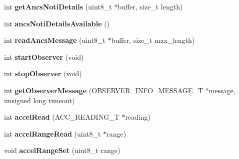 \begin{DoxyCompactItemize}
\item 
\hypertarget{class_bean_serial_transport_a88dd8beb51456e649b0bd3e0e98619ed}{}int {\bfseries get\+Ancs\+Noti\+Details} (uint8\+\_\+t $\ast$buffer, size\+\_\+t length)\label{class_bean_serial_transport_a88dd8beb51456e649b0bd3e0e98619ed}

\item 
\hypertarget{class_bean_serial_transport_a48970dd3b7bfd73d3ced63fbcc0477f9}{}int {\bfseries ancs\+Noti\+Details\+Available} ()\label{class_bean_serial_transport_a48970dd3b7bfd73d3ced63fbcc0477f9}

\item 
\hypertarget{class_bean_serial_transport_a4cda6d79f0522bcb8c71b07ad5714a16}{}int {\bfseries read\+Ancs\+Message} (uint8\+\_\+t $\ast$buffer, size\+\_\+t max\+\_\+length)\label{class_bean_serial_transport_a4cda6d79f0522bcb8c71b07ad5714a16}

\item 
\hypertarget{class_bean_serial_transport_abcb24e3817f867de9f88f6ba98181a95}{}int {\bfseries start\+Observer} (void)\label{class_bean_serial_transport_abcb24e3817f867de9f88f6ba98181a95}

\item 
\hypertarget{class_bean_serial_transport_af3005adba0525276d3e1205c06e3ff96}{}int {\bfseries stop\+Observer} (void)\label{class_bean_serial_transport_af3005adba0525276d3e1205c06e3ff96}

\item 
\hypertarget{class_bean_serial_transport_a4bb8a82e2cff3fb3dcc3bd00d8b245c7}{}int {\bfseries get\+Observer\+Message} (O\+B\+S\+E\+R\+V\+E\+R\+\_\+\+I\+N\+F\+O\+\_\+\+M\+E\+S\+S\+A\+G\+E\+\_\+\+T $\ast$message, unsigned long timeout)\label{class_bean_serial_transport_a4bb8a82e2cff3fb3dcc3bd00d8b245c7}

\item 
\hypertarget{class_bean_serial_transport_a12fc6f4829c492174ceb46767a2009ba}{}int {\bfseries accel\+Read} (A\+C\+C\+\_\+\+R\+E\+A\+D\+I\+N\+G\+\_\+\+T $\ast$reading)\label{class_bean_serial_transport_a12fc6f4829c492174ceb46767a2009ba}

\item 
\hypertarget{class_bean_serial_transport_a7b26e39083e54ab69e809fda821c924d}{}int {\bfseries accel\+Range\+Read} (uint8\+\_\+t $\ast$range)\label{class_bean_serial_transport_a7b26e39083e54ab69e809fda821c924d}

\item 
\hypertarget{class_bean_serial_transport_aaafa340752353267c127a793f9cc2e62}{}void {\bfseries accel\+Range\+Set} (uint8\+\_\+t range)\label{class_bean_serial_transport_aaafa340752353267c127a793f9cc2e62}


\end{DoxyCompactItemize}

